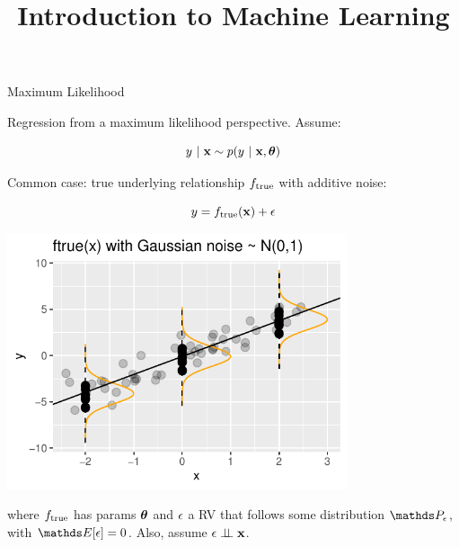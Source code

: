 \documentclass[11pt,compress,t,notes=noshow, xcolor=table]{beamer}
\title{Introduction to Machine Learning}
\begin{document}
    

\begin{vbframe}{Maximum Likelihood}

Regression from a maximum likelihood perspective. Assume: 

$$
	y~|~ \mathbf{x} \sim p(y~|~\mathbf{x}, \bm{\theta})
$$

\vspace{0.5cm}

Common case: 
true underlying relationship $f_{\text{true}}$ with additive noise: 

\vspace{0.5cm}

\begin{minipage}{0.5\textwidth}
$$
y = f_{\text{true}}(\mathbf{x}) + \epsilon
$$
\end{minipage}%
\begin{minipage}{0.5\textwidth}
\includegraphics[width = 0.75\textwidth]{figure/ftrue.pdf}
\end{minipage}

where $f_{\text{true}}$ has params $\bm{\theta}$ and $\epsilon$ a RV that follows some distribution $\P_\eps$, with $\E[\eps] = 0$. Also, assume $\epsilon \perp \!\!\! \perp \mathbf{x}$.



\end{vbframe}
\end{document}
